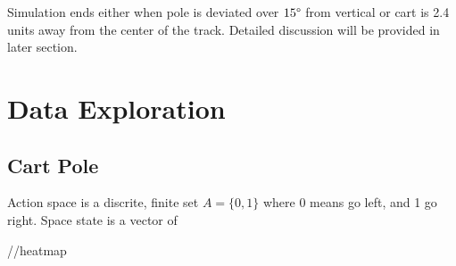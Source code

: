 \documentclass[12pt]{article}
\begin{document}
Simulation ends either when pole is deviated over $15\degree$ from vertical or cart is 2.4 units away from the center of the track. Detailed discussion will be provided in later section.


\section{Data Exploration}
\subsection{Cart Pole}

Action space is a discrite, finite set $A = \{0,1\}$ where 0 means go left, and 1 go right.
Space state is a vector of






//heatmap
\end{document}
